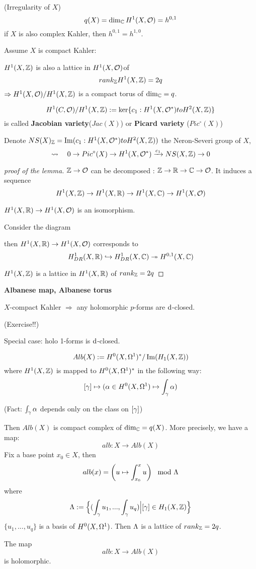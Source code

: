 \begin{definition}(Irregularity of $X$)
$$q(X)=\dim_{\mathbb{C}}H^1(X,\mathcal{O})
=h^{0,1}$$
if $X$ is also complex Kahler, then $h^{0,1}=h^{1,0}$.
\end{definition}

Assume $X$ is compact Kahler:

\begin{lemma}
$H^1(X,\mathbb{Z})$ is also a lattice in $H^1(X,\mathcal{O})$of
$$rank_{\mathbb{Z}}H^1(X,\mathbb{Z})=2q$$
$\Rightarrow H^1(X,\mathcal{O})/H^1(X,\mathbb{Z})$ is a
compact torus of $\dim_{\mathbb{C}}=q$.
\end{lemma}
$$H^1(C,\mathcal{O})/H^1(X,\mathbb{Z}):=
\ker\{c_1:H^1(X,\mathcal{O}^*)to H^2(X,\mathbb{Z})\}$$
is called \textbf{Jacobian variety}($Jac(X)$) or \textbf{Picard variety}
($Pic^\circ(X)$)

Denote $NS(X)_{\mathbb{Z}}=\operatorname{Im}(c_1:H^1(X,\mathcal{O}^*)to H^2(X,\mathbb{Z}))$
the Neron-Severi group of $X$,
$$
  \rightsquigarrow\quad
  0\to Pic^\circ(X)\to H^1(X,\mathcal{O}^*)\xrightarrow{c_1}NS(X,\mathbb{Z})\to 0
$$

\begin{proof}[proof of the lemma]

$\mathbb{Z}\to\mathcal{O}$ can be decomposed : $\mathbb{Z}\to\mathbb{R}\to\mathbb{C}\to\mathcal{O}$.
It induces a sequence
$$H^1(X,\mathbb{Z})\to H^1(X,\mathbb{R})\to H^1(X,\mathbb{C})\to H^1(X,\mathcal{O})$$

$H^1(X,\mathbb{R})\to H^1(X,\mathcal{O})$ is an isomorphism.

Consider the diagram

then $H^1(X,\mathbb{R})\to H^1(X,\mathcal{O})$ corresponds to
$$
  H^1_{DR}(X,\mathbb{R})\hookrightarrow H^1_{DR}(X,\mathbb{C})\twoheadrightarrow H^{0,1}(X,\mathbb{C})
$$

$H^1(X,\mathbb{Z})$ is a lattice in $H^1(X,\mathbb{R})$ of $rank_{\mathbb{Z}}=2q$
\end{proof}

\textbf{Albanese map, Albanese torus}

$X$-compact Kahler $\Rightarrow$ any holomorphic $p$-forms are $\mathrm{d}$-closed.

(Exercise!!)

Special case: holo 1-forms is $\mathrm{d}$-closed.

$$Alb(X):=H^0(X,\Omega^1)^*/\operatorname{Im}(H_1(X,\mathbb{Z}))$$
where $H^1(X,\mathbb{Z})$ is mapped to
$H^0(X,\Omega^1)^*$ in the following way:
$$[\gamma]\mapsto(\alpha\in H^0(X,\Omega^1)\mapsto\int_\gamma\alpha)$$

(Fact: $\int_\gamma\alpha$ depends only on the class on $[\gamma]$)

Then $Alb(X)$ is compact complex of $\dim_{\mathbb{C}}=q(X)$.
More precisely, we have a map:
$$alb: X\to Alb(X)$$
Fix a base point $x_0\in X$, then
$$alb(x)=
\left(
  u\mapsto
  \int_{x_0}^x u
\right)\mod{\Lambda}
$$
where
$$\Lambda:=\Big\{ (\int_\gamma u_1,...,\int_\gamma u_q) \Big| [\gamma]\in H_1(X,\mathbb{Z}) \Big\}$$
$\{u_1,...,u_q\}$ is a basis of $H^0(X,\Omega^1)$.
Then $\Lambda$ is a lattice of $rank_{\mathbb{Z}}=2q$.

The map
$$alb: X\to Alb(X)$$
is holomorphic.







